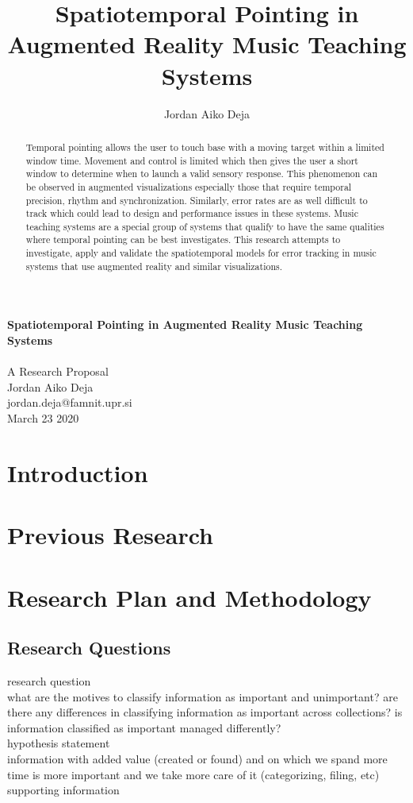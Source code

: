\documentclass{article}
\title{Spatiotemporal Pointing in Augmented Reality Music Teaching Systems}
\author{Jordan Aiko Deja}
\begin{document}
\begin{center}
\large \textbf{Spatiotemporal Pointing in Augmented Reality Music Teaching Systems}
\\            
\vspace{0.5cm}\\
A Research Proposal\\
\vspace{0.5cm}
Jordan Aiko Deja\\
jordan.deja@famnit.upr.si\\
\vspace{0.5cm}
March 23 2020
\vspace{0.5cm}
\end{center}
\nocite{*}

\begin{abstract}
     Temporal pointing allows the user to touch base with a moving target within a limited window time. Movement and control is limited which then gives the user a short window to determine when to launch a valid sensory response. This phenomenon can be observed in augmented visualizations especially those that require temporal precision, rhythm and synchronization. Similarly, error rates are as well difficult to track which could lead to design and performance issues in these systems. Music teaching systems are a special group of systems that qualify to have the same qualities where temporal pointing can be best investigates. This research attempts to investigate, apply and validate the spatiotemporal models for error tracking in music systems that use augmented reality and similar visualizations. 
\end{abstract}


\section{Introduction}
\section{Previous Research}
\section{Research Plan and Methodology}
\subsection{Research Questions}
research question\\
what are the motives to classify information as important and unimportant? are there any differences in classifying information as important across collections? is information classified as important managed differently? \\
hypothesis statement\\
information with added value (created or found) and on which we spand more time is more important and we take more care of it (categorizing, filing, etc)\\
supporting information\\
\end{document}
